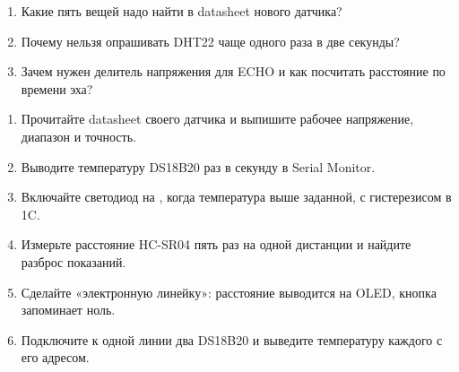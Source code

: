 \begin{selfcheck}
\begin{enumerate}
  \item Какие пять вещей надо найти в datasheet нового датчика?
  \item Почему нельзя опрашивать DHT22 чаще одного раза в две секунды?
  \item Зачем нужен делитель напряжения для ECHO и как посчитать расстояние по времени эха?
\end{enumerate}
\end{selfcheck}

\begin{tasks}
\begin{enumerate}
\item {} Прочитайте datasheet своего датчика и выпишите рабочее напряжение, диапазон и точность.
\item {} Выводите температуру DS18B20 раз в секунду в Serial Monitor.
\item {} Включайте светодиод на , когда температура выше заданной, с гистерезисом в 1\textdegree{}C.
\item {} Измерьте расстояние HC-SR04 пять раз на одной дистанции и найдите разброс показаний.
\item {} Сделайте «электронную линейку»: расстояние выводится на OLED, кнопка запоминает ноль.
\item {} Подключите к одной линии два DS18B20 и выведите температуру каждого с его адресом.
\end{enumerate}
\end{tasks}
